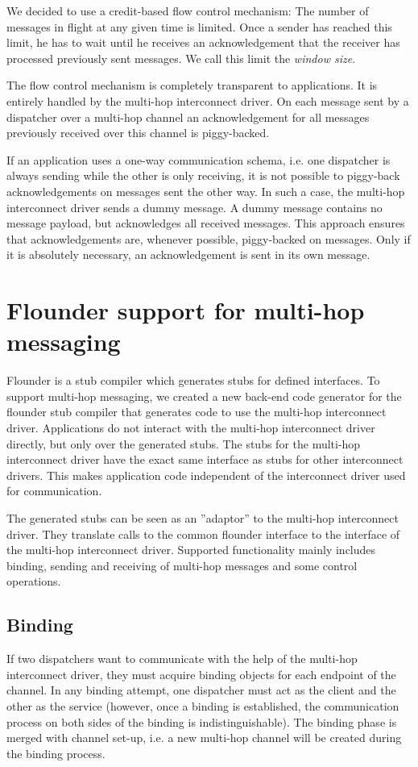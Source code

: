 \documentclass[a4paper,twoside]{report} %
\begin{document}
We decided to use a credit-based flow control mechanism: The number of messages in flight at any given time is limited. Once a sender has reached this limit, he has to wait until he receives an acknowledgement that the receiver has processed previously sent messages. We call this limit the \emph{window size}.

The flow control mechanism is completely transparent to applications. It is entirely handled by the multi-hop interconnect driver. On each message sent by a dispatcher over a multi-hop channel an acknowledgement for all messages previously received over this channel is piggy-backed. 

If an application uses a one-way communication schema, i.e. one dispatcher is always sending while the other is only receiving, it is not possible to piggy-back acknowledgements on messages sent the other way. In such a case, the multi-hop interconnect driver sends a dummy message. A dummy message contains no message payload, but acknowledges all received messages. This approach ensures that acknowledgements are, whenever possible, piggy-backed on messages. Only if it is absolutely necessary, an acknowledgement is sent in its own message.



\chapter{Flounder support for multi-hop messaging}
\label{chapter: flounder integration}

Flounder is a stub compiler which generates stubs for defined interfaces. To support multi-hop messaging, we created a new back-end code generator for the flounder stub compiler that generates code to use the multi-hop interconnect driver.  Applications do not interact with the multi-hop interconnect driver directly, but only over the generated stubs. The stubs for the multi-hop interconnect driver have the exact same interface as stubs for other interconnect drivers. This makes application code independent of the interconnect driver used for communication.

The generated stubs can be seen as an ''adaptor'' to the multi-hop interconnect driver. They  translate calls to the common flounder interface to the interface of the multi-hop interconnect driver. Supported functionality mainly includes binding, sending and receiving of multi-hop messages and some control operations.

\section{Binding}
If two dispatchers want to communicate with the help of the multi-hop interconnect driver, they must acquire binding objects for each endpoint of the channel. In any binding attempt, one dispatcher must act as the client and the other as the service (however, once a binding is established, the communication process on both sides of the binding is indistinguishable). The binding phase is merged with channel set-up, i.e. a new multi-hop channel will be created during the binding process. 
\end{document}
